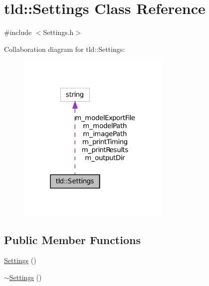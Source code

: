 \hypertarget{classtld_1_1_settings}{
\section{tld::Settings Class Reference}
\label{classtld_1_1_settings}
}


{\ttfamily \#include $<$Settings.h$>$}



Collaboration diagram for tld::Settings:
\nopagebreak
\begin{figure}[H]
\begin{center}
\leavevmode
\includegraphics[width=208pt]{classtld_1_1_settings__coll__graph}
\end{center}
\end{figure}
\subsection*{Public Member Functions}
\begin{DoxyCompactItemize}
\item 
\hyperlink{classtld_1_1_settings_a1a1d6373d0e350ef0f2697ea2a42894e}{Settings} ()
\item 
\hyperlink{classtld_1_1_settings_a96eee0f4e98b706b8b5f8ec973c24dbc}{$\sim$Settings} ()
\end{DoxyCompactItemize}
